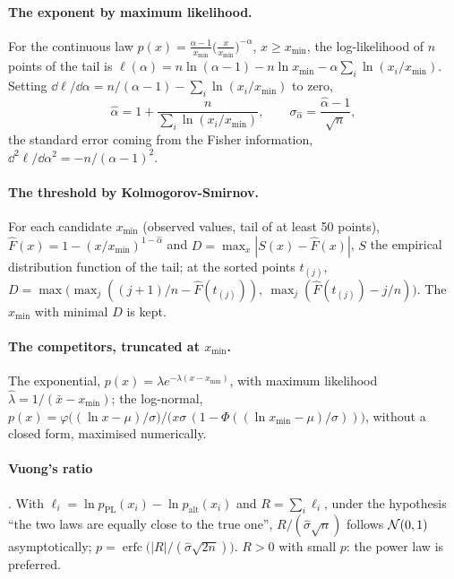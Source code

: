 \paragraph{The exponent by maximum likelihood.} For the continuous law $p(x) = \frac{\alpha - 1}{x_{\min}}\bigl(\frac{x}{x_{\min}}\bigr)^{-\alpha}$, $x \ge x_{\min}$, the log-likelihood of $n$ points of the tail is $\ell(\alpha) = n\ln(\alpha - 1) - n\ln x_{\min} - \alpha\sum_i \ln(x_i/x_{\min})$. Setting $\dd\ell/\dd\alpha = n/(\alpha - 1) - \sum_i\ln(x_i/x_{\min})$ to zero,
\begin{equation}\label{t3spe:eq:alpha}
\hat\alpha = 1 + \frac{n}{\sum_i \ln(x_i/x_{\min})}, \qquad \sigma_{\hat\alpha} = \frac{\hat\alpha - 1}{\sqrt n},
\end{equation}
the standard error coming from the Fisher information, $\dd^2\ell/\dd\alpha^2 = -n/(\alpha - 1)^2$.

\paragraph{The threshold by Kolmogorov-Smirnov.} For each candidate $x_{\min}$ (observed values, tail of at least 50 points), $\hat F(x) = 1 - (x/x_{\min})^{1-\hat\alpha}$ and $D = \max_x|S(x) - \hat F(x)|$, $S$ the empirical distribution function of the tail; at the sorted points $t_{(j)}$, $D = \max\bigl(\max_j ((j+1)/n - \hat F(t_{(j)})),\ \max_j (\hat F(t_{(j)}) - j/n)\bigr)$. The $x_{\min}$ with minimal $D$ is kept.

\paragraph{The competitors, truncated at $x_{\min}$.} The exponential, $p(x) = \lambda e^{-\lambda(x - x_{\min})}$, with maximum likelihood $\hat\lambda = 1/(\bar x - x_{\min})$; the log-normal, $p(x) = \varphi\bigl((\ln x - \mu)/\sigma\bigr)/\bigl(x\sigma\,(1 - \Phi((\ln x_{\min} - \mu)/\sigma))\bigr)$, without a closed form, maximised numerically.

\paragraph{Vuong's ratio} \cite{vuong1989likelihood}. With $\ell_i = \ln p_{\mathrm{PL}}(x_i) - \ln p_{\mathrm{alt}}(x_i)$ and $R = \sum_i \ell_i$, under the hypothesis ``the two laws are equally close to the true one'', $R/(\hat\sigma\sqrt n)$ follows $\mathcal{N}(0, 1)$ asymptotically; $p = \operatorname{erfc}\bigl(|R|/(\hat\sigma\sqrt{2n})\bigr)$. $R > 0$ with small $p$: the power law is preferred.

